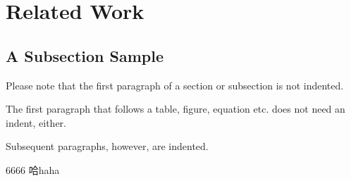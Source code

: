 \section{Related Work}
\subsection{A Subsection Sample}
Please note that the first paragraph of a section or subsection is not indented. 

The first paragraph that follows a table, figure,
equation etc. does not need an indent, either.

Subsequent paragraphs, however, are indented.\cite{luo2020dream}

6666
哈haha
